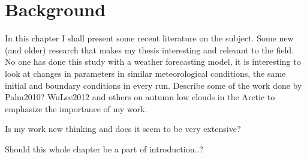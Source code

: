 \chapter{Background}
\label{chap:background}
In this chapter I shall present some recent literature on the subject. Some new (and older) research that makes my thesis interesting and relevant to the field. No one has done this study with a weather forecasting model, it is interesting to look at changes in parameters in similar meteorological conditions, the same initial and boundary conditions in every run.
Describe some of the work done by Palm2010? WuLee2012 and others on autumn low clouds in the Arctic to emphasize the importance of my work.

Is my work new thinking and does it seem to be very extensive?

Should this whole chapter be a part of introduction..?